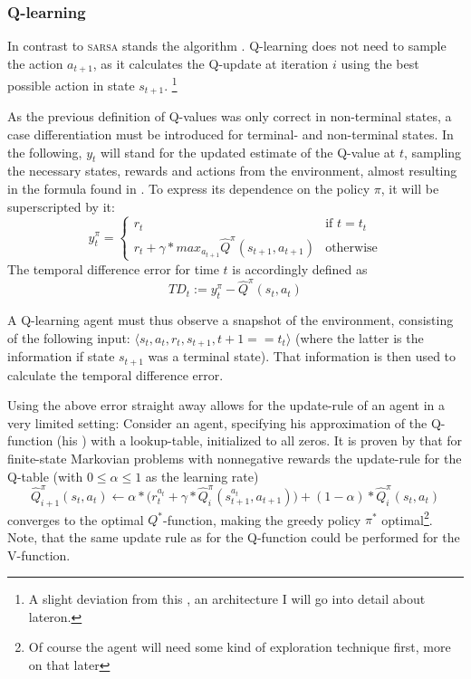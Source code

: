 \subsubsection{Q-learning}

In contrast to \textsc{sarsa} stands the  algorithm \cite{watkins_learning_1989}. Q-learning does not need to sample the action $a_{t+1}$, as it calculates the Q-update at iteration $i$ using the best possible action in state $s_{t+1}$. \footnote{A slight deviation from this , an architecture I will go into detail about lateron.} 

As the previous definition of Q-values was only correct in non-terminal states, a case differentiation must be introduced for terminal- and non-terminal states. In the following, $y_t$ will stand for the updated estimate of the Q-value at $t$, sampling the necessary states, rewards and actions from the environment, almost resulting in the formula found in \cite{mnih_human-level_2015}. To express its dependence on the policy $\pi$, it will be superscripted by it:
\begin{equation} \label{eq:ycases}
	y_t^\pi = \begin{cases} 
		r_t & \text{if } t = t_t\\
		r_t + \gamma * max_{a_{t+1}} \hat{Q}^\pi( s_{t+1}, a_{t+1}) & \text{otherwise}
\end{cases}
\end{equation}
The temporal difference error for time $t$ is accordingly defined as 
\begin{equation}
TD_t := y_t^\pi - \hat{Q}^\pi(s_t, a_t)
\end{equation}

A Q-learning agent must thus observe a snapshot of the environment, consisting of the following input: $\langle s_t, a_t, r_t, s_{t+1}, t+1==t_t \rangle$ (where the latter is the information if state $s_{t+1}$ was a terminal state). That information is then used to calculate the temporal difference error.

Using the above error straight away allows for the update-rule of an agent in a very limited setting: Consider an agent, specifying his approximation of the Q-function (his ) with a lookup-table, initialized to all zeros. It is proven by \cite{watkins_technical_1992} that for finite-state Markovian problems with nonnegative rewards the update-rule for the Q-table (with $0 \leq \alpha \leq 1$ as the learning rate)
\begin{equation*} \label{eq:qtable}
	\hat{Q}^\pi_{i+1}(s_t,a_t) \leftarrow \alpha * \Big(r_t^{a_t} + \gamma * \hat{Q}^\pi_i(s_{t+1}^{a_t},a_{t+1}) \Big) + (1-\alpha) * \hat{Q}^\pi_i(s_t,a_t)
\end{equation*}
converges to the optimal $Q^*$-function, making the greedy policy $\pi^*$ optimal\footnote{Of course the agent will need some kind of exploration technique first, more on that later}. Note, that the same update rule as for the Q-function could be performed for the V-function.\\

